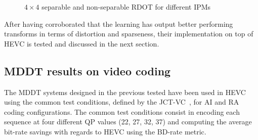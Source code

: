 \documentclass[11pt,a4paper,openright,twoside]{book}
\numberwithin{equation}{section} %
\numberwithin{figure}{section} %
\numberwithin{table}{section} %
\begin{document}
\begin{figure}[tb]
	\hfill
	\hfill
	\hfill
	\hfill
	\caption{$4\times4$ separable and non-separable \acs{RDOT} for different \acsp{IPM}}
	\label{fig:rdot_4x4_bases}
\end{figure}

After having corroborated that the learning has output better performing
transforms in terms of distortion and sparseness, their implementation on top
of \ac{HEVC} is tested and discussed in the next section.

\subsection{\acs{MDDT} results on video coding}
\label{sub:mddt_results_on_video_coding}

The \ac{MDDT} systems designed in the previous tested have been used in
\ac{HEVC} using the common test conditions, defined by the
\ac{JCT-VC}~\cite{bossen-12-common-test-conditions}, for \ac{AI} and \ac{RA}
coding configurations.
The common test conditions consist in encoding each sequence at four different
\ac{QP} values (22, 27, 32, 37) and computing the average bit-rate savings
with regards to \ac{HEVC} using the \ac{BD}-rate metric.
\end{document}
